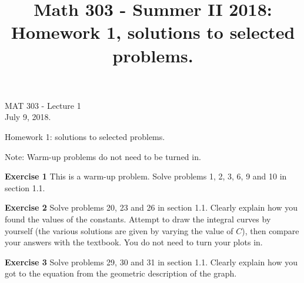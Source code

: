 \documentclass[12pt,oneside]{exam}
\title{Math 303 - Summer II 2018: Homework 1, solutions to selected problems. }
\newenvironment{exercise}[1]{\vspace{.1in}\noindent\textbf{Exercise #1 \hspace{.05em}}}{}
\begin{document}
\begin{flushright}
\sc MAT 303 - Lecture 1\\
July 9, 2018.
\end{flushright}
\bigskip

\begin{center}
\textsf{Homework 1: solutions to selected problems.} 
\end{center}


Note: Warm-up problems do not need to be turned in. 

\begin{exercise}{1}
This is a warm-up problem. Solve problems 1, 2, 3, 6, 9 and 10 in section 1.1. 
\end{exercise}

\begin{exercise}{2}
Solve problems 20, 23 and 26 in section 1.1. Clearly explain how you found the values of the constants. Attempt to draw the integral curves by yourself (the various solutions are given by varying the value of $C$), then compare your  answers with the textbook. You do not need to turn your plots in. 
\end{exercise}

\begin{exercise}{3}
Solve problems 29, 30 and 31 in section 1.1. Clearly explain how you got to the equation from the geometric description of the graph. 
\end{exercise}
\end{document}
